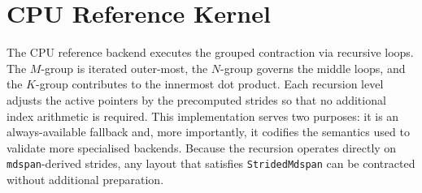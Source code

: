 \documentclass[11pt]{article}
\begin{document}
\section{CPU Reference Kernel}
The CPU reference backend executes the grouped contraction via recursive loops.  The $M$-group is
iterated outer-most, the $N$-group governs the middle loops, and the $K$-group contributes to the
innermost dot product.  Each recursion level adjusts the active pointers by the precomputed strides
so that no additional index arithmetic is required.  This implementation serves two purposes: it is
an always-available fallback and, more importantly, it codifies the semantics used to validate more
specialised backends.  Because the recursion operates directly on \texttt{mdspan}-derived strides,
any layout that satisfies \texttt{StridedMdspan} can be contracted without additional preparation.
\end{document}
